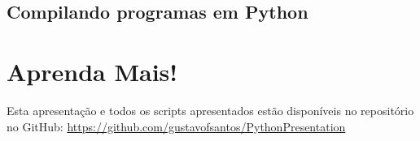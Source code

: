 \documentclass[aspectratio=169]{beamer}
\begin{document}
\subsection{Compilando programas em Python}



\section{Aprenda Mais!}

\begin{frame}
    Esta apresentação e todos os scripts apresentados estão disponíveis
no repositório no GitHub:
\url{https://github.com/gustavofsantos/PythonPresentation}
\end{frame}

\begin{frame}
\titlepage
\end{frame}
\end{document}

